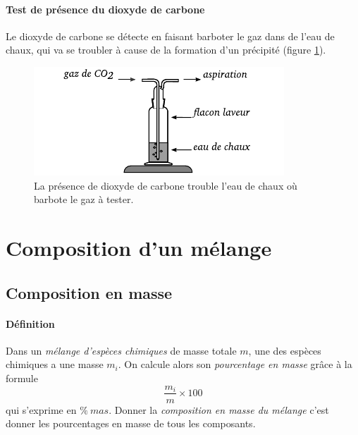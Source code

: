 \paragraph{Test de présence du dioxyde de carbone}
Le dioxyde de carbone se détecte en faisant barboter le gaz dans de l'eau de chaux, qui va se troubler à
cause de la formation d'un précipité (figure \ref{fig:test_presence_CO2}).
\begin{figure}[h]
  \begin{center}
      \includegraphics[width=\columnwidth]{1.1.-melanges/test_presence_CO2.pdf}
  \end{center}
  \caption{La présence de dioxyde de carbone trouble l'eau de chaux où barbote le gaz à tester.}
  \label{fig:test_presence_CO2}
\end{figure}


\section{Composition d'un mélange}
\subsection{Composition en masse}
\paragraph{Définition} Dans un \textit{mélange d'espèces chimiques} de masse totale $m$,
une des espèces chimiques a une masse $m_i$. On calcule alors son 
\textit{pourcentage en masse} grâce à la formule $$ \frac{m_i}{m} \times 100$$
qui s'exprime en $\%~mas $. Donner la \textit{composition en masse du mélange}
c'est donner les pourcentages en masse de tous les composants.
